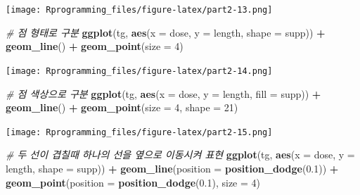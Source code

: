 \documentclass[10pt,]{krantz}
\makeatletter
\newenvironment{Shaded}{\begin{snugshade}}{\end{snugshade}}
\newcommand{\KeywordTok}[1]{\textcolor[rgb]{0.13,0.29,0.53}{\textbf{#1}}}
\newcommand{\DataTypeTok}[1]{\textcolor[rgb]{0.13,0.29,0.53}{#1}}
\newcommand{\DecValTok}[1]{\textcolor[rgb]{0.00,0.00,0.81}{#1}}
\newcommand{\FloatTok}[1]{\textcolor[rgb]{0.00,0.00,0.81}{#1}}
\newcommand{\StringTok}[1]{\textcolor[rgb]{0.31,0.60,0.02}{#1}}
\newcommand{\CommentTok}[1]{\textcolor[rgb]{0.56,0.35,0.01}{\textit{#1}}}
\newcommand{\OperatorTok}[1]{\textcolor[rgb]{0.81,0.36,0.00}{\textbf{#1}}}
\newcommand{\NormalTok}[1]{#1}
\newenvironment{kframe}{%
\medskip{}
\setlength{\fboxsep}{.8em}
 \def\at@end@of@kframe{}%
 \ifinner\ifhmode%
  \def\at@end@of@kframe{\end{minipage}}%
  \begin{minipage}{\columnwidth}%
 \fi\fi%
 \def\FrameCommand##1{\hskip\@totalleftmargin \hskip-\fboxsep
 \colorbox{shadecolor}{##1}\hskip-\fboxsep
     \hskip-\linewidth \hskip-\@totalleftmargin \hskip\columnwidth}%
 \MakeFramed {\advance\hsize-\width
   \@totalleftmargin\z@ \linewidth\hsize
   \@setminipage}}%
 {\par\unskip\endMakeFramed%
 \at@end@of@kframe}
\renewenvironment{Shaded}{\begin{kframe}}{\end{kframe}}
\theoremstyle{definition}
\theoremstyle{definition}
\theoremstyle{remark}
\makeatother
\begin{document}
\texttt{[image: Rprogramming\_files/figure-latex/part2-13.png]}

\begin{Shaded}
\begin{Highlighting}[]


\CommentTok{# 점 형태로 구분}
\KeywordTok{ggplot}\NormalTok{(tg, }\KeywordTok{aes}\NormalTok{(}\DataTypeTok{x =}\NormalTok{ dose, }\DataTypeTok{y =}\NormalTok{ length, }\DataTypeTok{shape =}\NormalTok{ supp)) }\OperatorTok{+}\StringTok{ }\KeywordTok{geom_line}\NormalTok{() }\OperatorTok{+}\StringTok{ }\KeywordTok{geom_point}\NormalTok{(}\DataTypeTok{size =} \DecValTok{4}\NormalTok{)}
\end{Highlighting}
\end{Shaded}

\texttt{[image: Rprogramming\_files/figure-latex/part2-14.png]}

\begin{Shaded}
\begin{Highlighting}[]


\CommentTok{# 점 색상으로 구분}
\KeywordTok{ggplot}\NormalTok{(tg, }\KeywordTok{aes}\NormalTok{(}\DataTypeTok{x =}\NormalTok{ dose, }\DataTypeTok{y =}\NormalTok{ length, }\DataTypeTok{fill =}\NormalTok{ supp)) }\OperatorTok{+}\StringTok{ }\KeywordTok{geom_line}\NormalTok{() }\OperatorTok{+}\StringTok{ }\KeywordTok{geom_point}\NormalTok{(}\DataTypeTok{size =} \DecValTok{4}\NormalTok{, }\DataTypeTok{shape =} \DecValTok{21}\NormalTok{)}
\end{Highlighting}
\end{Shaded}

\texttt{[image: Rprogramming\_files/figure-latex/part2-15.png]}

\begin{Shaded}
\begin{Highlighting}[]


\CommentTok{# 두 선이 겹칠때 하나의 선을 옆으로 이동시켜 표현  }
\KeywordTok{ggplot}\NormalTok{(tg, }\KeywordTok{aes}\NormalTok{(}\DataTypeTok{x =}\NormalTok{ dose, }\DataTypeTok{y =}\NormalTok{ length, }\DataTypeTok{shape =}\NormalTok{ supp)) }\OperatorTok{+}\StringTok{ }\KeywordTok{geom_line}\NormalTok{(}\DataTypeTok{position =} \KeywordTok{position_dodge}\NormalTok{(}\FloatTok{0.1}\NormalTok{)) }\OperatorTok{+}\StringTok{ }
\StringTok{  }\KeywordTok{geom_point}\NormalTok{(}\DataTypeTok{position =} \KeywordTok{position_dodge}\NormalTok{(}\FloatTok{0.1}\NormalTok{), }\DataTypeTok{size =} \DecValTok{4}\NormalTok{)}
\end{Highlighting}
\end{Shaded}
\end{document}
